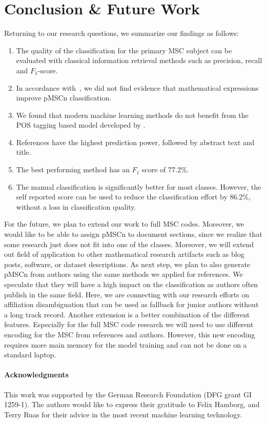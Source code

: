 \section{Conclusion \& Future Work}\label{sec.concl}
Returning to our research questions, we summarize our findings as follows:
\begin{enumerate}
  \item The quality of the classification for the primary MSC subject can be evaluated with classical information retrieval methods such as precision, recall and $F_1$-score.
  \item In accordance with~\cite{Scharpf2020}, we did not find evidence that mathematical expressions improve pMSCn classification.
  \item We found that modern machine learning methods do not benefit from the POS tagging based model developed by \cite{SchonebergS14}.
  \item References have the highest prediction power, followed by abstract text and title.
  \item The best performing method has an $F_1$ score of 77.2\%.
  \item The manual classification is significantly better for most classes. However, the self reported score can be used to reduce the classification effort by 86.2\%, without a loss in classification quality.
\end{enumerate}

For the future, we plan to extend our work to full MSC codes.
Moreover, we would like to be able to assign pMSCn to document sections, since we realize that some research just does not fit into one of the classes.
Moreover, we will extend out field of application to other mathematical research artifacts such as blog posts, software, or dataset descriptions.
As next step, we plan to also generate pMSCn from authors using the same methods we applied for references.
We speculate that they will have a high impact on the classification as authors often publish in the same field.
Here, we are connecting with our research efforts on affiliation disambiguation that can be used as fallback for junior authors without a long track record.
Another extension is a better combination of the different features.
Especially for the full MSC code research we will need to use different encoding for the MSC from references and authors.
However, this new encoding requires more main memory for the model training and can not be done on a standard laptop.

\paragraph{Acknowledgments} This work was supported by the German Research Foundation (DFG grant GI 1259-1).
The authors would like to express their gratitude to Felix Hamborg, and Terry Ruas for their advice in the most recent machine learning technology.
\printbibliography[keyword=primary]
